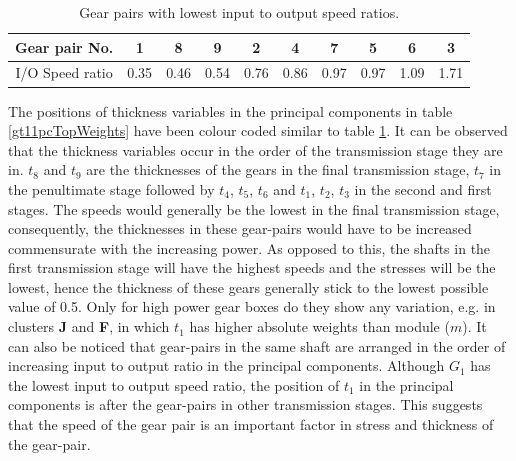 \begin{table}[!ht]
  \centering
  \begin{tabular}{|c|c|c|c|c|c|c|c|c|c|}
    \hline
    Gear pair No. & \cellcolor[gray]{0.40} 1 & \cellcolor[gray]{0.45} 8 & \cellcolor[gray]{0.50} 9 & \cellcolor[gray]{0.55} 2 & \cellcolor[gray]{0.60} 4 & \cellcolor[gray]{0.65} 7 & \cellcolor[gray]{0.70} 5 &\cellcolor[gray]{0.75} 6 & \cellcolor[gray]{0.80} 3\\
    \hline
    I/O Speed ratio & \cellcolor[gray]{0.40} 0.35 & \cellcolor[gray]{0.45} 0.46 & \cellcolor[gray]{0.50} 0.54 & \cellcolor[gray]{0.55} 0.76 & \cellcolor[gray]{0.60} 0.86 & \cellcolor[gray]{0.65} 0.97 & \cellcolor[gray]{0.70}0.97 & \cellcolor[gray]{0.75} 1.09 & \cellcolor[gray]{0.80} 1.71\\
    \hline
  \end{tabular}
  \caption{Gear pairs with lowest input to output speed ratios.}
  \label{iosRatio}
\end{table}


The positions of thickness variables in the principal components in table
\ref{gt11pcTopWeights} have been colour coded similar to table
\ref{iosRatio}. It can be observed that the thickness variables occur in
the order of the transmission stage they are in. $t_8$ and $t_9$ are the
thicknesses of the gears in the final transmission stage, $t_7$ in the
penultimate stage followed by $t_4$, $t_5$, $t_6$ and $t_1$, $t_2$, $t_3$
in the second and first stages.  The speeds would generally be the lowest
in the final transmission stage, consequently, the thicknesses in these
gear-pairs would have to be increased commensurate with the increasing
power. As opposed to this, the shafts in the first transmission stage will
have the highest speeds and the stresses will be the lowest, hence the
thickness of these gears generally stick to the lowest possible value of
0.5. Only for high power gear boxes do they show any variation, e.g.  in
clusters \textbf{J} and \textbf{F}, in which $t_1$ has higher absolute
weights than module ($m$). It can also be noticed that gear-pairs in the
same shaft are arranged in the order of increasing input to output ratio in
the principal components. Although $G_1$ has the lowest input to output
speed ratio, the position of $t_1$ in the principal components is after the
gear-pairs in other transmission stages. This suggests that the speed of
the gear pair is an important factor in stress and thickness of the
gear-pair.


